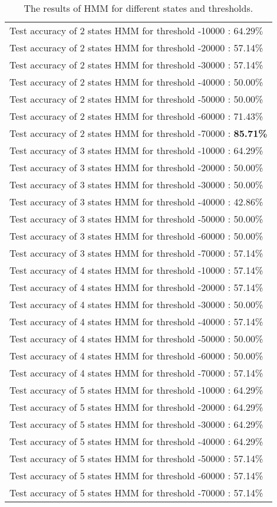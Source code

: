 \begin{table}[H]
\centering
\caption{The results of HMM for different states and thresholds.}
\label{tab:Q2_results}
\begin{tabular}{l}
\toprule
    Test accuracy of 2 states HMM for threshold -10000 : $64.29\%$ \\
    Test accuracy of 2 states HMM for threshold -20000 : 57.14\% \\
    Test accuracy of 2 states HMM for threshold -30000 : 57.14\% \\
    Test accuracy of 2 states HMM for threshold -40000 : 50.00\% \\
    Test accuracy of 2 states HMM for threshold -50000 : 50.00\% \\
    Test accuracy of 2 states HMM for threshold -60000 : 71.43\% \\
    Test accuracy of 2 states HMM for threshold -70000 : \textbf{85.71\%} \\
    Test accuracy of 3 states HMM for threshold -10000 : 64.29\% \\
    Test accuracy of 3 states HMM for threshold -20000 : 50.00\% \\
    Test accuracy of 3 states HMM for threshold -30000 : 50.00\% \\
    Test accuracy of 3 states HMM for threshold -40000 : 42.86\% \\
    Test accuracy of 3 states HMM for threshold -50000 : 50.00\% \\
    Test accuracy of 3 states HMM for threshold -60000 : 50.00\% \\
    Test accuracy of 3 states HMM for threshold -70000 : 57.14\% \\
    Test accuracy of 4 states HMM for threshold -10000 : 57.14\% \\
    Test accuracy of 4 states HMM for threshold -20000 : 57.14\% \\
    Test accuracy of 4 states HMM for threshold -30000 : 50.00\% \\
    Test accuracy of 4 states HMM for threshold -40000 : 57.14\% \\
    Test accuracy of 4 states HMM for threshold -50000 : 50.00\% \\
    Test accuracy of 4 states HMM for threshold -60000 : 50.00\% \\
    Test accuracy of 4 states HMM for threshold -70000 : 57.14\% \\
    Test accuracy of 5 states HMM for threshold -10000 : 64.29\% \\
    Test accuracy of 5 states HMM for threshold -20000 : 64.29\% \\
    Test accuracy of 5 states HMM for threshold -30000 : 64.29\% \\
    Test accuracy of 5 states HMM for threshold -40000 : 64.29\% \\
    Test accuracy of 5 states HMM for threshold -50000 : 57.14\% \\
    Test accuracy of 5 states HMM for threshold -60000 : 57.14\% \\
    Test accuracy of 5 states HMM for threshold -70000 : 57.14\% \\
\bottomrule


\end{tabular}
\end{table}
